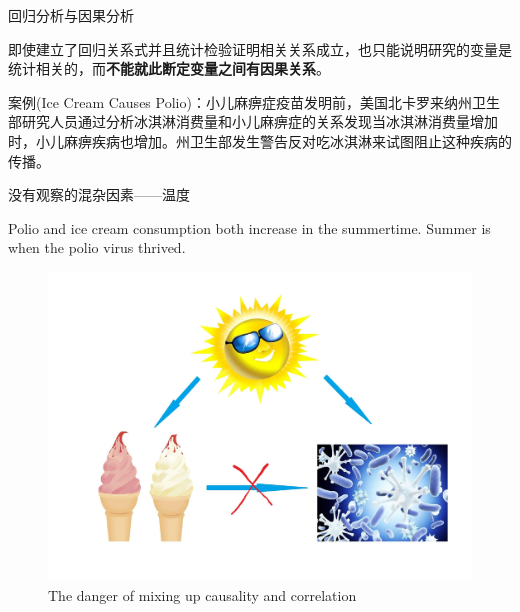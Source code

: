 \documentclass[ignorenonframetext,]{beamer}
\begin{document}
\begin{frame}{回归分析与因果分析}

即使建立了回归关系式并且统计检验证明相关关系成立，也只能说明研究的变量是统计相关的，而\textbf{不能就此断定变量之间有因果关系}。

案例(Ice Cream Causes
Polio)：小儿麻痹症疫苗发明前，美国北卡罗来纳州卫生部研究人员通过分析冰淇淋消费量和小儿麻痹症的关系发现当冰淇淋消费量增加时，小儿麻痹疾病也增加。州卫生部发生警告反对吃冰淇淋来试图阻止这种疾病的传播。

\end{frame}

\begin{frame}{没有观察的混杂因素------温度}

Polio and ice cream consumption both increase in the summertime. Summer
is when the polio virus thrived.

\begin{figure}
\includegraphics[width=0.65\linewidth]{ice} \caption{The danger of mixing up causality and correlation}\label{fig:unnamed-chunk-27}
\end{figure}

\end{frame}
\end{document}
